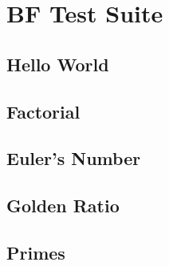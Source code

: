 \chapter{BF Test Suite} \label{sec:appendix:testsuite}

\section{Hello World} \label{sec:appendix:testsuite:hello}
\begin{lstfloat}[H]
    
\caption{hello.bf, \cite{hello}}
\label{lst:hello}
\end{lstfloat}


\section{Factorial} \label{sec:appendix:testsuite:factorial}
\begin{lstfloat}[H]
    
\caption{factorial.bf}
\label{lst:factorial}
\end{lstfloat}

\section{Euler's Number} \label{sec:appendix:testsuite:euler}
\begin{lstfloat}[H]
    
\caption{euler.bf, \cite{euler}}
\label{lst:euler}
\end{lstfloat}

\section{Golden Ratio} \label{sec:appendix:testsuite:phi}
\begin{lstfloat}[H]
    
\caption{phi.bf, \cite{phi}}
\label{lst:phi}
\end{lstfloat}

\section{Primes} \label{sec:appendix:testsuite:primes}
\begin{lstfloat}[H]
    
\caption{primes.bf, \cite{primes}}
\label{lst:primes}
\end{lstfloat}

